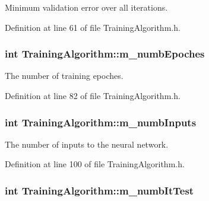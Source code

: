 Minimum validation error over all iterations. 



Definition at line 61 of file Training\+Algorithm.\+h.

\subsubsection[{\texorpdfstring{m\+\_\+numb\+Epoches}{m_numbEpoches}}]{\setlength{\rightskip}{0pt plus 5cm}int Training\+Algorithm\+::m\+\_\+numb\+Epoches\hspace{0.3cm}{\ttfamily [private]}}\hypertarget{classTrainingAlgorithm_aca4ca80f4bab494a8de2ea99c79b30d1}{}\label{classTrainingAlgorithm_aca4ca80f4bab494a8de2ea99c79b30d1}


The number of training epoches. 



Definition at line 82 of file Training\+Algorithm.\+h.

\subsubsection[{\texorpdfstring{m\+\_\+numb\+Inputs}{m_numbInputs}}]{\setlength{\rightskip}{0pt plus 5cm}int Training\+Algorithm\+::m\+\_\+numb\+Inputs\hspace{0.3cm}{\ttfamily [private]}}\hypertarget{classTrainingAlgorithm_a9b599ede34f6e22fb267f9056cb21925}{}\label{classTrainingAlgorithm_a9b599ede34f6e22fb267f9056cb21925}


The number of inputs to the neural network. 



Definition at line 100 of file Training\+Algorithm.\+h.

\subsubsection[{\texorpdfstring{m\+\_\+numb\+It\+Test}{m_numbItTest}}]{\setlength{\rightskip}{0pt plus 5cm}int Training\+Algorithm\+::m\+\_\+numb\+It\+Test\hspace{0.3cm}{\ttfamily [private]}}\hypertarget{classTrainingAlgorithm_a2f247e588d2c35a31f664a20b282ed8e}{}\label{classTrainingAlgorithm_a2f247e588d2c35a31f664a20b282ed8e}


